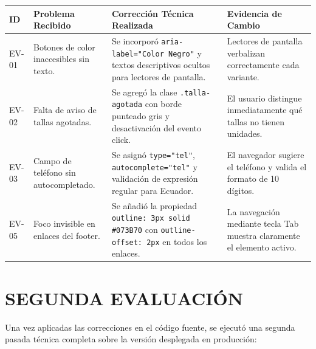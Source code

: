 \documentclass[12pt]{article}
\begin{document}
\begin{table}[H]
\centering
\small
\renewcommand{\arraystretch}{1.3}
\begin{tabularx}{\textwidth}{|p{1.2cm}|p{3.2cm}|X|p{3.2cm}|}
\hline
\textbf{ID} & \textbf{Problema Recibido} & \textbf{Corrección Técnica Realizada} & \textbf{Evidencia de Cambio} \\ \hline
EV-01 & Botones de color inaccesibles sin texto. & Se incorporó \texttt{aria-label="Color Negro"} y textos descriptivos ocultos para lectores de pantalla. & Lectores de pantalla verbalizan correctamente cada variante. \\ \hline
EV-02 & Falta de aviso de tallas agotadas. & Se agregó la clase \texttt{.talla-agotada} con borde punteado gris y desactivación del evento click. & El usuario distingue inmediatamente qué tallas no tienen unidades. \\ \hline
EV-03 & Campo de teléfono sin autocompletado. & Se asignó \texttt{type="tel"}, \texttt{autocomplete="tel"} y validación de expresión regular para Ecuador. & El navegador sugiere el teléfono y valida el formato de 10 dígitos. \\ \hline
EV-05 & Foco invisible en enlaces del footer. & Se añadió la propiedad \texttt{outline: 3px solid \#073B70} con \texttt{outline-offset: 2px} en todos los enlaces. & La navegación mediante tecla Tab muestra claramente el elemento activo. \\ \hline
\end{tabularx}
\end{table}

\section*{SEGUNDA EVALUACIÓN}
Una vez aplicadas las correcciones en el código fuente, se ejecutó una segunda pasada técnica completa sobre la versión desplegada en producción:
\end{document}
